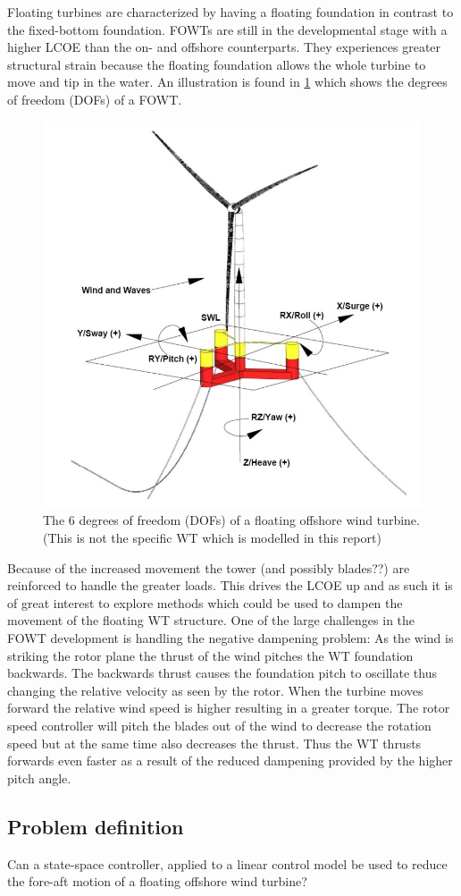 Floating turbines are characterized by having a floating foundation in contrast to the fixed-bottom foundation. FOWTs are still in the developmental stage with a higher LCOE than the on- and offshore counterparts. They experiences greater structural strain because the floating foundation allows the whole turbine to move and tip in the water. An illustration is found in \cref{fig:fowt_coordinates} which shows the degrees of freedom (DOFs) of a FOWT. 
\begin{figure}[h]
	\centering
	\includegraphics[width=0.55\linewidth]{Graphics/FOWTcoordinates.png}
	\caption{The 6 degrees of freedom (DOFs) of a floating offshore wind turbine. (This is not the specific WT which is modelled in this report) \cite{Vanelli2021}}
	\label{fig:fowt_coordinates}
\end{figure}
Because of the increased movement the tower (and possibly blades??) are reinforced to handle the greater loads. This drives the LCOE up and as such it is of great interest to explore methods which could be used to dampen the movement of the floating WT structure. One of the large challenges in the FOWT development is handling the negative dampening problem: As the wind is striking the rotor plane the thrust of the wind pitches the WT foundation backwards. The backwards thrust causes the foundation pitch to oscillate thus changing the relative velocity as seen by the rotor. When the turbine moves forward the relative wind speed is higher resulting in a greater torque. The rotor speed controller will pitch the blades out of the wind to decrease the rotation speed but at the same time also decreases the thrust. Thus the WT thrusts forwards even faster as a result of the reduced dampening provided by the higher pitch angle.



\subsection{Problem definition}
Can a state-space controller, applied to a linear control model be used to reduce the fore-aft motion of a floating offshore wind turbine?


